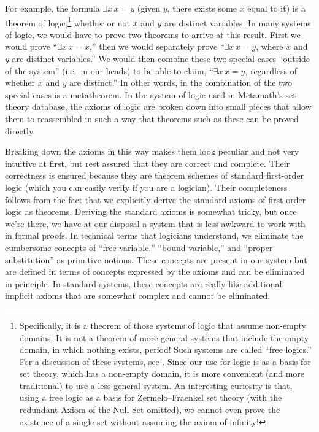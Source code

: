 For example, the formula $\exists x \, x = y $ (given $y$, there exists some
$x$ equal to it) is a theorem of logic,\footnote{Specifically, it is a theorem
of those systems of logic that assume non-empty domains.  It is not a theorem
of more general systems that include the empty domain, in
which nothing exists, period!  Such systems are called ``free
logics.'' For a discussion of these systems, see
\cite{Leblanc}.  Since our use for logic is as a basis
for set theory, which has a non-empty domain, it is more convenient (and more
traditional) to use a less general system.  An interesting curiosity is that,
using a free logic as a basis for Zermelo--Fraenkel set
theory (with the redundant Axiom of the
Null Set omitted), we cannot even prove the
existence of a single set without assuming the axiom of infinity!} whether or not $x$ and $y$ are distinct variables.  In many systems of logic, we would have to prove two theorems to
arrive at this result.  First we would prove ``$\exists x \, x = x $,'' then
we would separately prove ``$\exists x \, x = y $, where $x$ and $y$ are
distinct variables.''  We would then combine these two special cases ``outside
of the system'' (i.e.\ in our heads) to be able to claim, ``$\exists x \, x =
y $, regardless of whether $x$ and $y$ are distinct.''  In other words, in the
combination of the two special cases is a
metatheorem.  In the system of logic
used in Metamath's set theory
database, the axioms of logic are broken down into small pieces that allow
them to reassembled in such a way that theorems such as these can be proved
directly.

Breaking down the axioms in this way makes them look peculiar and not very
intuitive at first, but rest assured that they are correct and complete.  Their
correctness is ensured because they are theorem schemes of standard first-order
logic (which you can easily verify if you are a logician).  Their completeness
follows from the fact that we explicitly derive the standard axioms of
first-order logic as theorems.  Deriving the standard axioms is somewhat
tricky, but once we're there, we have at our disposal a system that is less
awkward to work with in formal proofs.  In technical terms
that logicians understand, we eliminate the cumbersome concepts of ``free
variable,'' ``bound variable,'' and
``proper substitution''
as primitive notions.  These concepts are present in our system but are
defined in terms of concepts expressed by the axioms and can be eliminated in
principle.  In standard systems, these concepts are really like additional,
implicit axioms that are somewhat complex and cannot be
eliminated.

